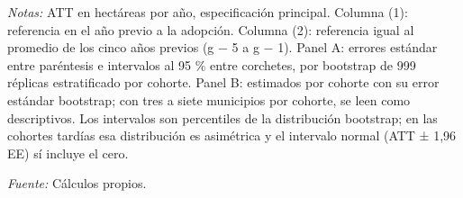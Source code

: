 \begin{table}[htbp]
\begin{threeparttable}
\begin{tablenotes}[flushleft]
\footnotesize
\item \textit{Notas:} ATT en hectáreas por año, especificación principal. Columna (1): referencia en el año previo a la adopción. Columna (2): referencia igual al promedio de los cinco años previos (g $-$ 5 a g $-$ 1). Panel A: errores estándar entre paréntesis e intervalos al 95 \% entre corchetes, por bootstrap de 999 réplicas estratificado por cohorte. Panel B: estimados por cohorte con su error estándar bootstrap; con tres a siete municipios por cohorte, se leen como descriptivos. Los intervalos son percentiles de la distribución bootstrap; en las cohortes tardías esa distribución es asimétrica y el intervalo normal (ATT ± 1,96 EE) sí incluye el cero.
\item \textit{Fuente:} Cálculos propios.
\end{tablenotes}
\end{threeparttable}
\end{table}
